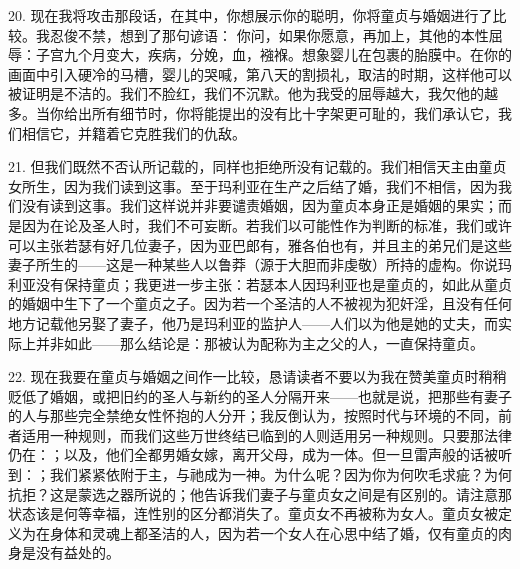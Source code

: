20. 现在我将攻击那段话，在其中，你想展示你的聪明，你将童贞与婚姻进行了比较。我忍俊不禁，想到了那句谚语： 你问，如果你愿意，再加上，其他的本性屈辱：子宫九个月变大，疾病，分娩，血，襁褓。想象婴儿在包裹的胎膜中。在你的画面中引入硬冷的马槽，婴儿的哭喊，第八天的割损礼，取洁的时期，这样他可以被证明是不洁的。我们不脸红，我们不沉默。他为我受的屈辱越大，我欠他的越多。当你给出所有细节时，你将能提出的没有比十字架更可耻的，我们承认它，我们相信它，并籍着它克胜我们的仇敌。\par

21. 但我们既然不否认所记载的，同样也拒绝所没有记载的。我们相信天主由童贞女所生，因为我们读到这事。至于玛利亚在生产之后结了婚，我们不相信，因为我们没有读到这事。我们这样说并非要谴责婚姻，因为童贞本身正是婚姻的果实；而是因为在论及圣人时，我们不可妄断。若我们以可能性作为判断的标准，我们或许可以主张若瑟有好几位妻子，因为亚巴郎有，雅各伯也有，并且主的弟兄们是这些妻子所生的——这是一种某些人以鲁莽（源于大胆而非虔敬）所持的虚构。你说玛利亚没有保持童贞；我更进一步主张：若瑟本人因玛利亚也是童贞的，如此从童贞的婚姻中生下了一个童贞之子。因为若一个圣洁的人不被视为犯奸淫，且没有任何地方记载他另娶了妻子，他乃是玛利亚的监护人——人们以为他是她的丈夫，而实际上并非如此——那么结论是：那被认为配称为主之父的人，一直保持童贞。\par

22. 现在我要在童贞与婚姻之间作一比较，恳请读者不要以为我在赞美童贞时稍稍贬低了婚姻，或把旧约的圣人与新约的圣人分隔开来——也就是说，把那些有妻子的人与那些完全禁绝女性怀抱的人分开；我反倒认为，按照时代与环境的不同，前者适用一种规则，而我们这些万世终结已临到的人则适用另一种规则。只要那法律仍在：；以及，他们全都男婚女嫁，离开父母，成为一体。但一旦雷声般的话被听到：；我们紧紧依附于主，与祂成为一神。为什么呢？因为你为何吹毛求疵？为何抗拒？这是蒙选之器所说的；他告诉我们妻子与童贞女之间是有区别的。请注意那状态该是何等幸福，连性别的区分都消失了。童贞女不再被称为女人。童贞女被定义为在身体和灵魂上都圣洁的人，因为若一个女人在心思中结了婚，仅有童贞的肉身是没有益处的。\par

